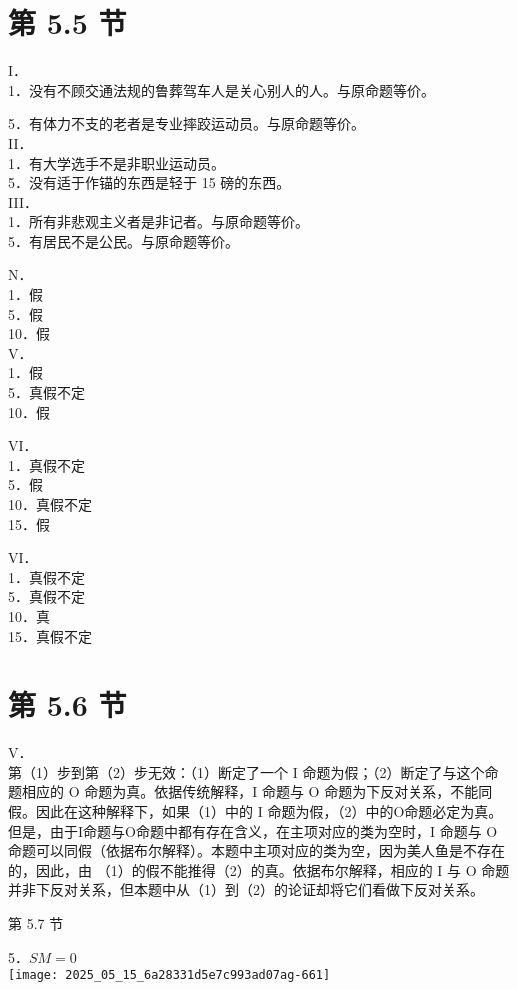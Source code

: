 \section*{第 5.5 节}
I．\\
1．没有不顾交通法规的鲁葬驾车人是关心别人的人。与原命题等价。

5．有体力不支的老者是专业摔跤运动员。与原命题等价。\\
II．\\
1．有大学选手不是非职业运动员。\\
5．没有适于作锚的东西是轻于 15 磅的东西。\\
III．\\
1．所有非悲观主义者是非记者。与原命题等价。\\
5．有居民不是公民。与原命题等价。

N．\\
1．假\\
5．假\\
10．假\\
V．\\
1．假\\
5．真假不定\\
10．假

VI．\\
1．真假不定\\
5．假\\
10．真假不定\\
15．假

VI．\\
1．真假不定\\
5．真假不定\\
10．真\\
15．真假不定

\section*{第 5.6 节}
V．\\
第（1）步到第（2）步无效：（1）断定了一个 I 命题为假；（2）断定了与这个命题相应的 O 命题为真。依据传统解释，I 命题与 O 命题为下反对关系，不能同假。因此在这种解释下，如果（1）中的 I 命题为假，（2）中的O命题必定为真。但是，由于I命题与O命题中都有存在含义，在主项对应的类为空时，I 命题与 O 命题可以同假（依据布尔解释）。本题中主项对应的类为空，因为美人鱼是不存在的，因此，由 （1）的假不能推得（2）的真。依据布尔解释，相应的 I 与 O 命题并非下反对关系，但本题中从（1）到（2）的论证却将它们看做下反对关系。

第 5.7 节

5．$S M=0$\\
\texttt{[image: 2025\_05\_15\_6a28331d5e7c993ad07ag-661]}

